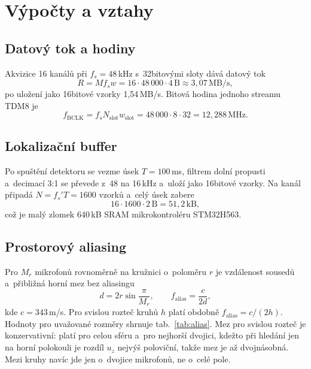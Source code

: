 \documentclass[conference]{IEEEtran}
\begin{document}
\section{Výpočty a vztahy}
\label{sec:vypocty}
\subsection*{Datový tok a hodiny}
Akvizice 16 kanálů při $f_s=48$\,kHz s~32bitovými sloty dává datový tok
\begin{equation}
  R = M f_s w = 16 \cdot 48\,000 \cdot 4\,\mathrm{B} \approx 3{,}07\,\mathrm{MB/s},
\end{equation}
po uložení jako 16bitové vzorky 1{,}54\,MB/s. Bitová hodina jednoho streamu TDM8 je
\begin{equation}
  f_{\mathrm{BCLK}} = f_s N_{\mathrm{slot}} w_{\mathrm{slot}} = 48\,000 \cdot 8 \cdot 32 = 12{,}288\,\mathrm{MHz}.
\end{equation}

\subsection*{Lokalizační buffer}
Po spuštění detektoru se vezme úsek $T=100$\,ms, filtrem dolní propusti a~decimací 3:1 se převede z~48 na 16\,kHz a~uloží jako 16bitové vzorky. Na kanál připadá $N = f_s' T = 1600$ vzorků a~celý úsek zabere
\begin{equation}
  16 \cdot 1600 \cdot 2\,\mathrm{B} = 51{,}2\,\mathrm{kB},
\end{equation}
což je malý zlomek 640\,kB SRAM mikrokontroléru STM32H563.

\subsection*{Prostorový aliasing}
Pro $M_r$ mikrofonů rovnoměrně na kružnici o~poloměru $r$ je vzdálenost sousedů a~přibližná horní mez bez aliasingu
\begin{equation}
  d = 2r\sin\frac{\pi}{M_r}, \qquad f_{\mathrm{alias}} = \frac{c}{2d},
\end{equation}
kde $c=343$\,m/s. Pro svislou rozteč kruhů $h$ platí obdobně $f_{\mathrm{alias}} = c/(2h)$. Hodnoty pro uvažované rozměry shrnuje tab.~\ref{tab:alias}. Mez pro svislou rozteč je konzervativní: platí pro celou sféru a~pro nejhorší dvojici, kdežto při hledání jen na horní polokouli je rozdíl $u_z$ nejvýš poloviční, takže mez je až dvojnásobná. Mezi kruhy navíc jde jen o~dvojice mikrofonů, ne o~celé pole.
\end{document}
